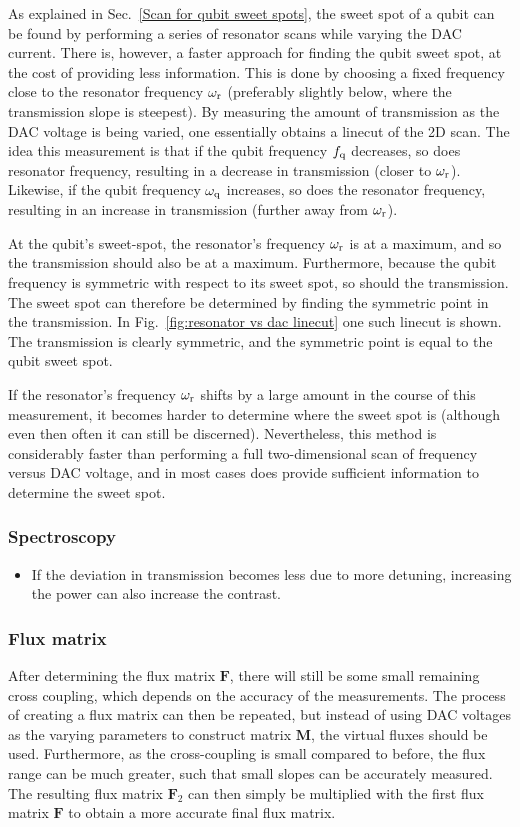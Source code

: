         As explained in Sec.~\ref{Scan for qubit sweet spots}, the sweet spot of a qubit can be found by performing a series of resonator scans while varying the DAC current. There is, however, a faster approach for finding the qubit sweet spot, at the cost of providing less information. This is done by choosing a fixed frequency close to the resonator  frequency $\omega_\text{r}$ (preferably slightly below, where the transmission slope is steepest). By measuring the amount of transmission as the DAC voltage is being varied, one essentially obtains a linecut of the 2D scan. The idea this measurement is that if the qubit frequency $f_\text{q}$ decreases, so does resonator frequency, resulting in a decrease in transmission (closer to $\omega_\text{r}$). Likewise, if the qubit frequency $\omega_\text{q}$ increases, so does the resonator frequency, resulting in an increase in transmission (further away from $\omega_\text{r}$).

        At the qubit's sweet-spot, the resonator's frequency $\omega_\text{r}$ is at a maximum, and so the transmission should also be at a maximum. Furthermore, because the qubit frequency is symmetric with respect to its sweet spot, so should the transmission. The sweet spot can therefore be determined by finding the symmetric point in the transmission. In Fig.~\ref{fig:resonator vs dac linecut} one such linecut is shown. The transmission is clearly symmetric, and the symmetric point is equal to the qubit sweet spot.

        If the resonator's frequency $\omega_\text{r}$ shifts by a large amount in the course of this measurement, it becomes harder to determine where the sweet spot is (although even then often it can still be discerned). Nevertheless, this method is considerably faster than performing a full two-dimensional scan of frequency versus DAC voltage, and in most cases does provide sufficient information to determine the sweet spot.


      \subsubsection{Spectroscopy}
        \begin{itemize}
          \item If the deviation in transmission becomes less due to more detuning, increasing the power can also increase the contrast.
        \end{itemize}
      \subsubsection{Flux matrix}
        After determining the flux matrix $\boldsymbol{F}$, there will still be some small remaining cross coupling, which depends on the accuracy of the measurements. The process of creating a flux matrix can then be repeated, but instead of using DAC voltages as the varying parameters to construct matrix $\boldsymbol{M}$, the virtual fluxes should be used. Furthermore, as the cross-coupling is small compared to before, the flux range can be much greater, such that small slopes can be accurately measured. The resulting flux matrix $\boldsymbol{F}_2$ can then simply be multiplied with the first flux matrix $\boldsymbol{F}$ to obtain a more accurate final flux matrix.
